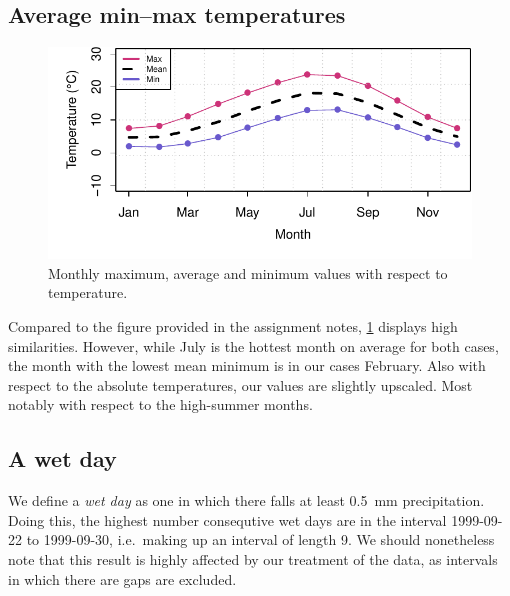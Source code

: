 \documentclass[10pt]{article}\usepackage[]{graphicx}\usepackage[]{color}
\makeatletter
\def\maxwidth{ %
  \ifdim\Gin@nat@width>\linewidth
    \linewidth
  \else
    \Gin@nat@width
  \fi
}
\newenvironment{knitrout}{}{} %
\theoremstyle{plain}
\makeatother
\begin{document}
\newpage
\subsection{Average min--max temperatures}
\begin{knitrout}
\color{fgcolor}\begin{figure}[H]

{\centering \includegraphics[width=\maxwidth]{figure/graphics-minMaxMonth-1} 

}

\caption[Monthly maximum, average and minimum values with respect to temperature]{Monthly maximum, average and minimum values with respect to temperature.}\label{fig:minMaxMonth}
\end{figure}


\end{knitrout}

Compared to the figure provided in the assignment notes, \cref{fig:minMaxMonth} displays high similarities. However, while July is the hottest month on average for both cases, the month with the lowest mean minimum is in our cases February. Also with respect to the absolute temperatures, our values are slightly upscaled. Most notably with respect to the high-summer months.

\subsection{A wet day}

We define a \textit{wet day} as one in which there falls at least 0.5~mm precipitation. Doing this, the highest number consequtive wet days are in the interval 1999-09-22 to 1999-09-30, i.e.\ making up an interval of length 9. We should nonetheless note that this result is highly affected by our treatment of the data, as intervals in which there are gaps are excluded. 
\end{document}
